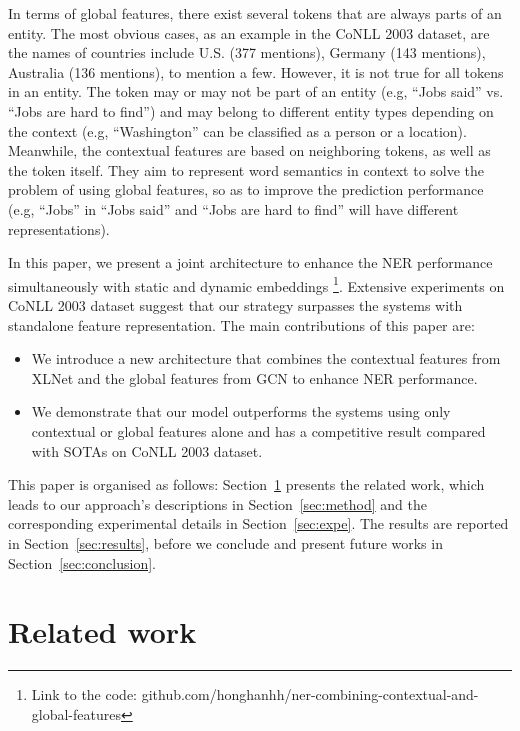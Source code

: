 \documentclass[runningheads]{llncs}
\begin{document}
In terms of global features, there exist several tokens that are always parts of an entity. 
The most obvious cases, as an example in the CoNLL 2003 dataset,  are the names of countries include U.S. (377 mentions), Germany (143 mentions), Australia (136 mentions), to mention a few. However, it is not true for all tokens in an entity. The token may or may not be part of an entity (e.g, ``Jobs said'' vs. ``Jobs are hard to find'') and may belong to different entity types depending on the context (e.g, ``Washington'' can be classified as a person or a location). Meanwhile, the contextual features are based on neighboring tokens, as well as the token itself. They aim to represent word semantics in context to solve the problem of using global features, so as to improve the prediction performance (e.g, ``Jobs'' in ``Jobs said'' and ``Jobs are hard to find'' will have different representations).



In this paper, we present a joint architecture to enhance the NER performance simultaneously with static and dynamic embeddings \footnote{Link to the code: github.com/honghanhh/ner-combining-contextual-and-global-features}. Extensive experiments on CoNLL 2003 dataset suggest that our strategy surpasses the systems with standalone feature representation. The main contributions of this paper are: \begin{itemize}
    \item We introduce a new architecture that combines the contextual features from XLNet and the global features from GCN to enhance NER performance.
    \item We demonstrate that our model outperforms the systems using only contextual or global features alone and has a competitive result compared with SOTAs on CoNLL 2003 dataset.
\end{itemize}

This paper is organised as follows: Section~\ref{sec:sota} presents the related work, which leads to our approach's descriptions in Section~\ref{sec:method} and the corresponding experimental details in Section~\ref{sec:expe}. The results are reported in Section~\ref{sec:results}, before we conclude and present future works in Section~\ref{sec:conclusion}.
\vspace{-0.2cm}
\section{Related work}
\label{sec:sota}
\end{document}
